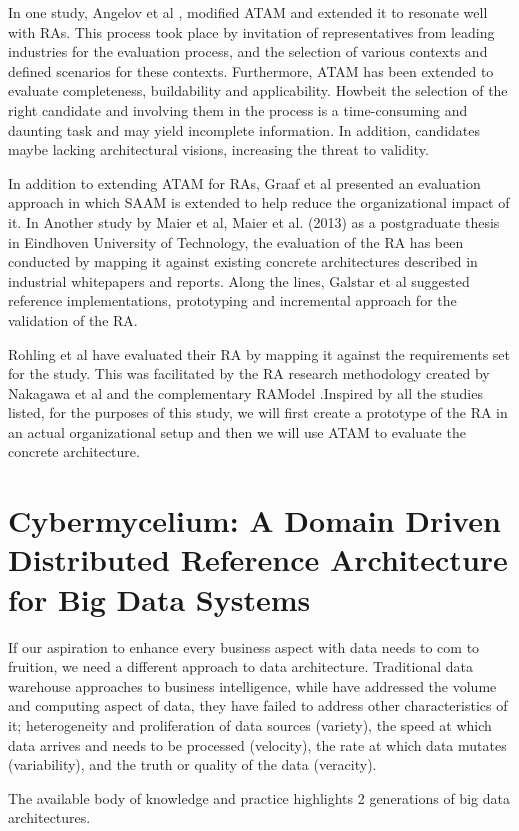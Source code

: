 \documentclass[review]{elsarticle}
\begin{document}
In one study, Angelov et al \cite{angelov2008towards}, modified ATAM and extended it to resonate well with RAs. This process took place by invitation of representatives from leading industries for the evaluation process, and the selection of various contexts and defined scenarios for these contexts. Furthermore, ATAM has been extended to evaluate completeness, buildability and applicability. Howbeit the selection of the right candidate and involving them in the process is a time-consuming and daunting task and may yield incomplete information. In addition, candidates maybe lacking architectural visions, increasing the threat to validity. 

In addition to extending ATAM for RAs, Graaf et al \cite{graaf2005evaluating} presented an evaluation approach in which SAAM is extended to help reduce the organizational impact of it. In Another study by Maier et al, Maier et al. (2013) as a postgraduate thesis in Eindhoven University of Technology, the evaluation of the RA has been conducted by mapping it against existing concrete architectures described in industrial whitepapers and reports. Along the lines, Galstar et al \cite{galster2011empirically} suggested reference implementations, prototyping and incremental approach for the validation of the RA. 

Rohling et al \cite{rohling2019reference} have evaluated their RA by mapping it against the requirements set for the study. This was facilitated by the RA research methodology created by Nakagawa et al \cite{Nakagawa} and the complementary RAModel \cite{nakagawa2012ramodel}.Inspired by all the studies listed, for the purposes of this study, we will first create a prototype of the RA in an actual organizational setup and then we will use ATAM to evaluate the concrete architecture. 

\section{Cybermycelium: A Domain Driven Distributed Reference Architecture for Big Data Systems}

If our aspiration to enhance every business aspect with data needs to com to fruition, we need a different approach to data architecture. Traditional data warehouse approaches to business intelligence, while have addressed the volume and computing aspect of data, they have failed to address other characteristics of it; heterogeneity and proliferation of data sources (variety), the speed at which data arrives and needs to be processed (velocity), the rate at which data mutates (variability), and the truth or quality of the data (veracity).

The available body of knowledge and practice highlights 2 generations of big data architectures. 


\end{document}
